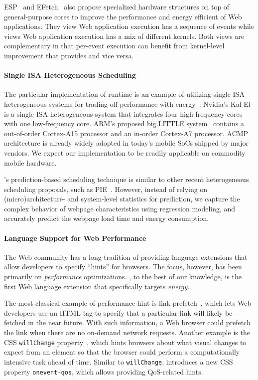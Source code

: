ESP~\cite{esp} and EFetch~\cite{efetch} also propose specialized hardware structures on top of general-purpose cores to improve the performance and energy efficient of Web applications. They view Web application execution has a sequence of events while \webcore views Web application execution has a mix of different kernels. Both views are complementary in that per-event execution can benefit from kernel-level improvement that \webcore provides and vice versa.

\paragraph{Single ISA Heterogeneous Scheduling} The particular implementation of \greenweb runtime is an example of utilizing single-ISA heterogeneous systems for trading off performance with energy~\cite{single-ISA}. Nvidia's Kal-El~\cite{Tegra3} is a single-ISA heterogeneous system that integrates four high-frequency cores with one low-frequency core. ARM's proposed big.LITTLE system~\cite{big.little} contains a out-of-order Cortex-A15 processor and an in-order Cortex-A7 processor. ACMP architecture is already widely adopted in today's mobile SoCs shipped by major vendors. We expect our \webrt implementation to be readily applicable on commodity mobile hardware.

\webrt's prediction-based scheduling technique is similar to other recent heterogeneous scheduling proposals, such as PIE~\cite{PIE}. However, instead of relying on (micro)architecture- and system-level statistics for prediction, we capture the complex behavior of webpage characteristics using regression modeling, and accurately predict the webpage load time and energy consumption.

\paragraph{Language Support for Web Performance} The Web community has a long tradition of providing language extensions that allow developers to specify ``hints'' for browsers. The focus, however, has been primarily on \textit{performance} optimizations. \greenweb, to the best of our knowledge, is the first Web language extension that specifically targets \textit{energy}.

The most classical example of performance hint is link prefetch~\cite{linkprefetch}, which lets Web developers use an HTML tag to specify that a particular link will likely be fetched in the near future. With such information, a Web browser could prefetch the link when there are no on-demand network requests. Another example is the CSS \texttt{willChange} property~\cite{csswillchange}, which hints browsers about what visual changes to expect from an element so that the browser could perform a computationally intensive task ahead of time. Similar to \texttt{willChange}, \greenweb introduces a new CSS property \texttt{onevent-qos}, which allows providing QoS-related hints.


